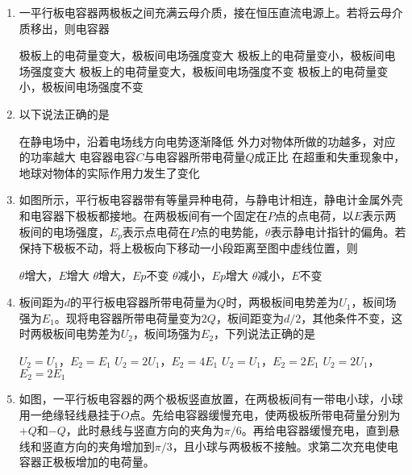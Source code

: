 \begin{enumerate}[leftmargin=0em]
\item
{}
一平行板电容器两极板之间充满云母介质，接在恒压直流电源上。若将云母介质移出，则电容器  


\fourchoices
{极板上的电荷量变大，极板间电场强度变大}
{极板上的电荷量变小，极板间电场强度变大}
{极板上的电荷量变大，极板间电场强度不变}
{极板上的电荷量变小，极板间电场强度不变}






\item
{}
以下说法正确的是  


\fourchoices
{在静电场中，沿着电场线方向电势逐渐降低}
{外力对物体所做的功越多，对应的功率越大}
{电容器电容$ C $与电容器所带电荷量$ Q $成正比}
{在超重和失重现象中，地球对物体的实际作用力发生了变化}




\item
{}
如图所示，平行板电容器带有等量异种电荷，与静电计相连，静电计金属外壳和电容器下极板都接地。在两极板间有一个固定在$ P $点的点电荷，以$ E $表示两板间的电场强度，$ E_{p} $表示点电荷在$ P $点的电势能，$ \theta $表示静电计指针的偏角。若保持下极板不动，将上极板向下移动一小段距离至图中虚线位置，则  
\begin{figure}[h!]
\centering

\end{figure}


\fourchoices
{$ \theta $增大，$ E $增大}
{$ \theta $增大，$ Ep $不变 }
{$ \theta $减小，$ Ep $增大}
{$ \theta $减小，$ E $不变}



\item
{}
板间距为$ d $的平行板电容器所带电荷量为$ Q $时，两极板间电势差为$ U_{1} $，板间场强为$ E_{1} $。现将电容器所带电荷量变为$ 2Q $，板间距变为$ d/2 $，其他条件不变，这时两极板间电势差为$ U_{2} $，板间场强为$ E_{2} $，下列说法正确的是  


\fourchoices
{$ U_{2} = U_{1} $，$ E_{2} = E_{1} $ }
{$ U_{2} =2 U_{1} $，$ E_{2} =4 E_{1} $}
{$ U_{2} = U_{1} $，$ E_{2} =2 E_{1} $}
{$ U_{2} =2 U_{1} $，$ E_{2} =2 E_{1} $}






\item
{}
如图，一平行板电容器的两个极板竖直放置，在两极板间有一带电小球，小球用一绝缘轻线悬挂于$ O $点。先给电容器缓慢充电，使两极板所带电荷量分别为$ + Q $和$ -Q $，此时悬线与竖直方向的夹角为$ \pi /6 $。再给电容器缓慢充电，直到悬线和竖直方向的夹角增加到$ \pi /3 $，且小球与两极板不接触。求第二次充电使电容器正极板增加的电荷量。



\end{enumerate}
